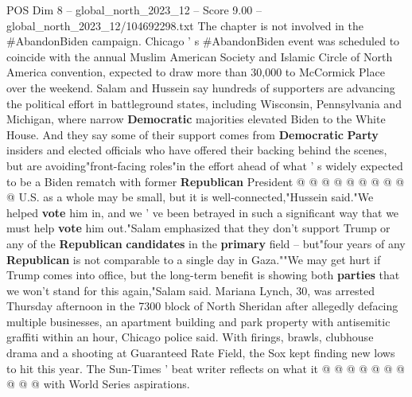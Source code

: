 \begin{textsample}{POS Dim 8 – global\_north\_2023\_12 – Score 9.00 – global\_north\_2023\_12/104692298.txt}
The chapter is not involved in the \#AbandonBiden campaign.
Chicago ' s \#AbandonBiden event was scheduled to coincide with the annual Muslim American Society and Islamic Circle of North America convention, expected to draw more than 30,000 to McCormick Place over the weekend.
Salam and Hussein say hundreds of supporters are advancing the political effort in battleground states, including Wisconsin, Pennsylvania and Michigan, where narrow \textbf{Democratic} majorities elevated Biden to the White House.
And they say some of their support comes from \textbf{Democratic} \textbf{Party} insiders and elected officials who have offered their backing behind the scenes, but are avoiding"front-facing roles"in the effort ahead of what ' s widely expected to be a Biden rematch with former \textbf{Republican} President @ @ @ @ @ @ @ @ @ @ U.S. as a whole may be small, but it is well-connected,"Hussein said."We helped \textbf{vote} him in, and we ' ve been betrayed in such a significant way that we must help \textbf{vote} him out."Salam emphasized that they don't support Trump or any of the \textbf{Republican} \textbf{candidates} in the \textbf{primary} field -- but"four years of any \textbf{Republican} is not comparable to a single day in Gaza.""We may get hurt if Trump comes into office, but the long-term benefit is showing both \textbf{parties} that we won't stand for this again,"Salam said.
Mariana Lynch, 30, was arrested Thursday afternoon in the 7300 block of North Sheridan after allegedly defacing multiple businesses, an apartment building and park property with antisemitic graffiti within an hour, Chicago police said.
With firings, brawls, clubhouse drama and a shooting at Guaranteed Rate Field, the Sox kept finding new lows to hit this year.
The Sun-Times ' beat writer reflects on what it @ @ @ @ @ @ @ @ @ @ with World Series aspirations.

\end{textsample}
